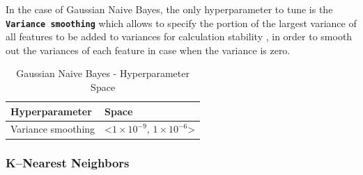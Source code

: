 In the case of Gaussian Naive Bayes, the only hyperparameter to tune is the \textbf{\texttt{Variance smoothing}} which allows to specify the portion of the largest variance of all features to be added to variances for calculation stability \citep{scikit-gnb}, in order to smooth out the variances of each feature in case when the variance is zero.
\begin{table}[H]
\small
\setlength{\tabcolsep}{8pt}
\renewcommand{\arraystretch}{1.3}
\centering
    \caption[Gaussian Naive Bayes - Hyperparameter Space]{Gaussian Naive Bayes  - Hyperparameter Space}\label{tab:gnbspace}
    \begin{tabular}{ll}
\toprule
\textbf{Hyperparameter} & \textbf{Space}\\
\midrule
\hline
Variance smoothing & <$1\times 10^{-9}$, $1\times 10^{-6}$> \\
\hline
\bottomrule
\end{tabular}
\vspace{0.7em}

\vspace{-1em}
\end{table}


\subsubsection{K--Nearest Neighbors}

